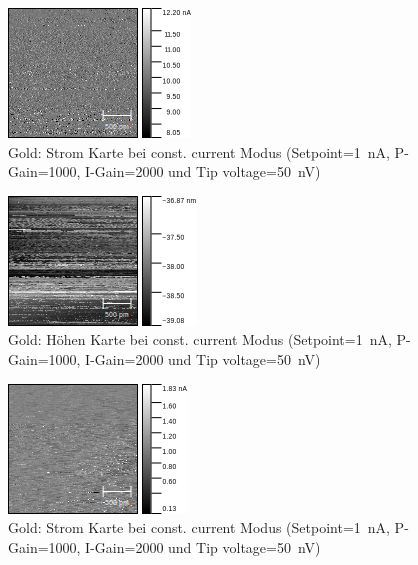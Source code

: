 \documentclass[sn-mathphys-num,iicol]{sn-jnl}
\theoremstyle{thmstyleone}
\theoremstyle{thmstyletwo}
\theoremstyle{thmstylethree}
\begin{document}
\begin{figure}[t]
        \centering
        \includegraphics[width=.5\textwidth]{../data/Graphit5_current.png}
        \caption{Gold: Strom Karte bei const. current Modus (Setpoint=\SI{1}{\nano A}, P-Gain=\SI{1000}{}, I-Gain=\SI{2000}{} und Tip voltage=\SI{50}{\nano V})} \label{fig:gr5c}
\end{figure}
\begin{figure}[t]
        \centering
        \includegraphics[width=.5\textwidth]{../data/Graphit5_z.png}
        \caption{Gold: Höhen Karte bei const. current Modus (Setpoint=\SI{1}{\nano A}, P-Gain=\SI{1000}{}, I-Gain=\SI{2000}{} und Tip voltage=\SI{50}{\nano V})} \label{fig:gr5z}
\end{figure}
\begin{figure}[t]
        \centering
        \includegraphics[width=.5\textwidth]{../data/Graphit6_current.png}
        \caption{Gold: Strom Karte bei const. current Modus (Setpoint=\SI{1}{\nano A}, P-Gain=\SI{1000}{}, I-Gain=\SI{2000}{} und Tip voltage=\SI{50}{\nano V})} \label{fig:gr6c}
\end{figure}
\end{document}
